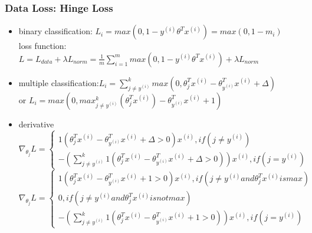 \begin{frame}
\frametitle{Data Loss: Hinge Loss}
	\small
	\begin{itemize}
		\item binary classification: $L_i=max(0,1-y^{(i)}\theta^Tx^{(i)})=max(0,1-m_i)$
		\\loss function: $L=L_{data}+\lambda L_{norm}=\frac{1}{m}\sum_{i=1}^{m}max(0,1-y^{(i)}\theta^Tx^{(i)})+\lambda L_{norm}$
		\item multiple classification:$L_i=\sum_{j\neq y^{(i)}}^{k}
										max(0,
											\theta_j^Tx^{(i)}-
											\theta_{y^{(i)}}^Tx^{(i)}+
											\Delta)$
		\\\hspace{3cm}or $L_i=			max(0,
											max_{j\neq y^{(i)}}^{k}(
											\theta_j^Tx^{(i)})-
											\theta_{y^{(i)}}^Tx^{(i)}+
											1)$
		\item derivative\\
\footnotesize
				\begin{equation}
					\nabla_{\theta_j} L=
					\left\{
						\begin{aligned}
							1(
								\theta_j^Tx^{(i)}
								-\theta_{y^{(i)}}^Tx^{(i)}
								+\Delta > 0
							)x^{(i)}, if(j\neq y^{(i)})\\
							-(
								\sum_{j\neq y^{(i)}}^k
									1(
										\theta_j^Tx^{(i)}
										-\theta_{y^{(i)}}^Tx^{(i)}
										+\Delta > 0
									)
							)x^{(i)}, if(j= y^{(i)})
						\end{aligned}
					\right.
				\end{equation}
				\begin{equation}
					\nabla_{\theta_j} L=
					\left\{
						\begin{aligned}
							1(
										\theta_j^Tx^{(i)}-
										\theta_{y^{(i)}}^Tx^{(i)}+
										1 > 0
							)x^{(i)}, 
								if(j\neq y^{(i)} and \theta_j^Tx^{(i)} is max)\\
							0, if(j\neq y^{(i)} and \theta_j^Tx^{(i)} is not max)\\
							-(
								\sum_{j\neq y^{(i)}}^k
									1(
											\theta_j^Tx^{(i)}-
											\theta_{y^{(i)}}^Tx^{(i)}+
											1 > 0
									)
							)x^{(i)}, if(j= y^{(i)})
						\end{aligned}
					\right.
				\end{equation}
	\end{itemize}
\end{frame}
